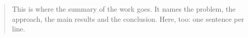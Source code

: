 
\pagestyle{empty}

\renewcommand{\abstractname}{Abstract}
\begin{abstract}
This is where the summary of the work goes.
It names the problem, the approach, the main results and the conclusion.
Here, too: one sentence per line.
\end{abstract}
